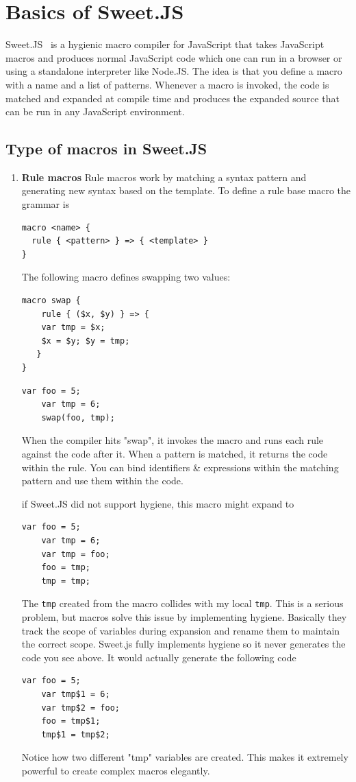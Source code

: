 \chapter{Basics of Sweet.JS}
Sweet.JS~\cite{bib6} is a hygienic macro compiler for JavaScript that takes JavaScript macros and produces normal JavaScript code which one can run in a browser or using a standalone interpreter like Node.JS. The idea is that you define a macro with a name and a list of patterns. Whenever a macro is invoked, the code is matched and expanded at  compile time and produces the expanded source that can be run in any JavaScript environment. 
\section{Type of macros in Sweet.JS}
\begin{enumerate}
\item {\bf Rule macros }
Rule macros work by matching a syntax pattern and generating new syntax based on the template.
To define a rule base macro the grammar is
\begin{lstlisting}[frame=single]
macro <name> {
  rule { <pattern> } => { <template> }
}
\end{lstlisting} 

The following macro defines swapping two values:
\begin{lstlisting}[frame=single]
macro swap {
	rule { ($x, $y) } => {
	var tmp = $x;
	$x = $y; $y = tmp;
   }
}
\end{lstlisting}
\begin{lstlisting}[frame=single]
	var foo = 5;
	var tmp = 6;
	swap(foo, tmp);
\end{lstlisting} 

When the compiler hits "swap", it invokes the macro and runs each rule against the code after it. When a pattern is matched, it returns the code within the rule. You can bind identifiers \& expressions within the matching pattern and use them within the code.

if Sweet.JS did not support hygiene, this macro might expand to
\begin{lstlisting}[frame=single]
	var foo = 5;
	var tmp = 6;
	var tmp = foo;
	foo = tmp;
	tmp = tmp;
\end{lstlisting} 
The \texttt{tmp} created from the macro collides with my local \texttt{tmp}. This is a serious problem, but macros solve this issue by implementing hygiene. Basically they track the scope of variables during expansion and rename them to maintain the correct scope. Sweet.js fully implements hygiene so it never generates the code you see above. It would actually generate the following code
\begin{lstlisting}[frame=single]
	var foo = 5;
	var tmp$1 = 6;
	var tmp$2 = foo;
	foo = tmp$1;
	tmp$1 = tmp$2;
\end{lstlisting} 
Notice how two different "tmp" variables are created. This makes it extremely powerful to create complex macros elegantly.


\end{enumerate}
